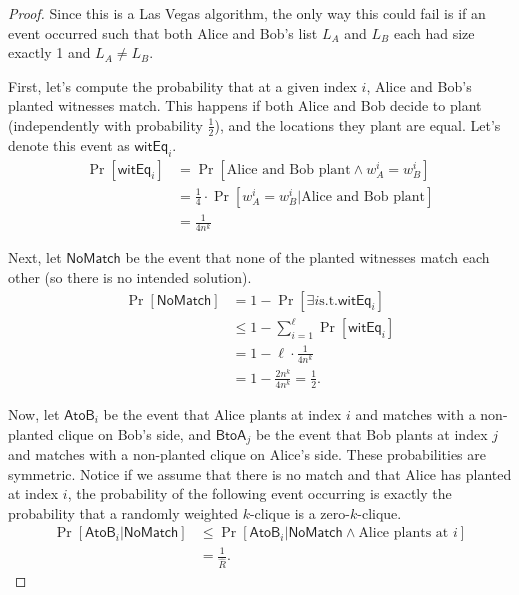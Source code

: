 \begin{proof}
	Since this is a Las Vegas algorithm, the only way this could fail is if an event occurred such that both Alice and Bob's list $L_A$ and $L_B$ each had size exactly 1 and $L_A \neq L_B$.
	
	First, let's compute the probability that at a given index $i$, Alice and Bob's planted witnesses match. This happens if both Alice and Bob decide to plant (independently with probability $\frac 1 2$), and the locations they plant are equal. Let's denote this event as $\mathsf{witEq}_i$.
	\begin{align*}
	\Pr[\mathsf{witEq}_i] &= \Pr[\mbox{Alice and Bob plant} \land w_A^i = w_B^i]\\
	&= \frac{1}{4} \cdot \Pr[w_A^i = w_B^i \vert \mbox{Alice and Bob plant}]\\
	&= \frac {1}{4n^k}
	\end{align*}
	
	Next, let $\mathsf{NoMatch}$ be the event that none of the planted witnesses match each other (so there is no intended solution).
	\begin{align*}
	\Pr[\mathsf{NoMatch}] &= 1 - \Pr[\exists i \mbox{s.t.} \mathsf{witEq}_i]\\
	&\le 1 - \sum_{i = 1}^{\ell} \Pr[\mathsf{witEq}_i]\\
	&= 1 - \ell \cdot \frac{1}{4n^k}\\
	&= 1 - \frac{2n^k}{4n^k} = \frac 1 2.
	\end{align*}
	
	Now, let $\mathsf{AtoB}_i$ be the event that Alice plants at index $i$ and matches with a non-planted clique on Bob's side, and $\mathsf{BtoA}_j$ be the event that Bob plants at index $j$ and matches with a non-planted clique on Alice's side. These probabilities are symmetric. Notice if we assume that there is no match and that Alice has planted at index $i$, the probability of the following event occurring is exactly the probability that a randomly weighted $k$-clique is a zero-$k$-clique.
	\begin{align*}
	\Pr[\mathsf{AtoB}_i \vert \mathsf{NoMatch}] &\le \Pr[\mathsf{AtoB}_i \vert \mathsf{NoMatch} \land \mbox{Alice plants at } i]\\
	&= \frac{1}{\hat R}.
	\end{align*}
	

\end{proof}
